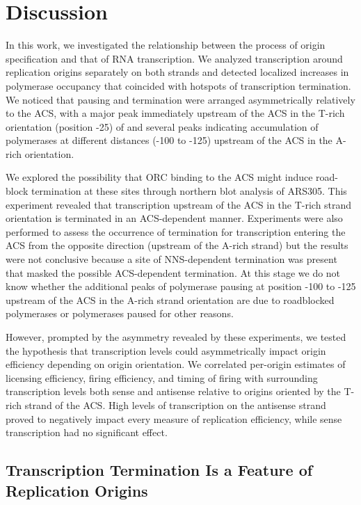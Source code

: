 \clearpage

\section{Discussion}

In this work, we investigated the relationship between the process of origin specification and that of RNA transcription. We analyzed transcription around replication origins separately on both strands and detected localized increases in polymerase occupancy that coincided with hotspots of transcription termination. We noticed that pausing and termination were arranged asymmetrically relatively to the ACS, with a major peak immediately upstream of the ACS in the T-rich orientation (position -25) of and several peaks indicating accumulation of polymerases at different distances (-100 to -125) upstream of the ACS in the  A-rich  orientation.

We explored the possibility that ORC binding to the ACS might induce road-block termination at these sites through northern blot analysis of ARS305. This experiment revealed that transcription upstream of the ACS in the T-rich strand orientation is terminated in an ACS-dependent manner. Experiments were also performed to assess the occurrence of termination for transcription entering the ACS from the opposite direction (upstream of the A-rich strand) but the results were not conclusive because a site of NNS-dependent termination was present that masked the possible ACS-dependent termination. At this stage we do not know whether the additional peaks of polymerase pausing at position -100 to -125 upstream of the ACS in the A-rich strand orientation are due to roadblocked polymerases or polymerases paused for other reasons.  

However, prompted by the asymmetry revealed by these experiments, we tested the hypothesis that transcription levels could asymmetrically impact origin efficiency depending on origin orientation. We correlated per-origin estimates of licensing efficiency, firing efficiency, and timing of firing with surrounding transcription levels both sense and antisense relative to origins oriented by the T-rich strand of the ACS. High levels of transcription on the antisense strand proved to negatively impact every measure of replication efficiency, while sense transcription had no significant effect.

\singlespacing
\subsection{Transcription Termination Is a Feature of Replication Origins}
\doublespacing


